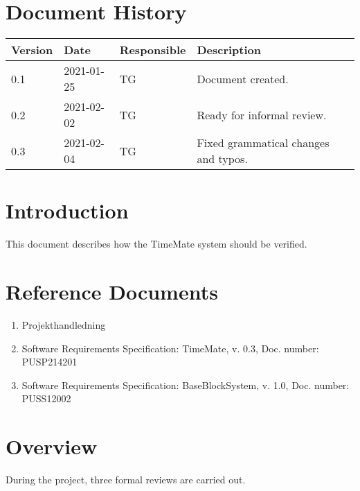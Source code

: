 \documentclass{article}
\date {#1}
\title {
    \documentNumber {02}    
    
    \documentVersion {0.3}
    
    \documentTitle {Software Verification and Validation Specification}
    \documentGroup {2}
    
    \documentResponsible {Test Group}
    \documentAuthors {Test Group}
    
    \documentDate {2021-02-04}
}
\begin{document}
\maketitle
\thispagestyle{empty}

\newpage

\tableofcontents

\newpage



\section{Document History}
\begin{tabular}{ l | l | l | l }
    Version & Date & Responsible & Description \\
    \hline
    0.1 & 2021-01-25 & TG & Document created. \\
    0.2 & 2021-02-02 & TG & Ready for informal review. \\
    0.3 & 2021-02-04 & TG & Fixed grammatical changes and typos. \\
\end{tabular}

\section{Introduction}

	This document describes how the TimeMate system should be verified. 

\section{Reference Documents}

\begin{enumerate}
  \item Projekthandledning 
  \item Software Requirements Specification: TimeMate, v. 0.3, Doc. number: PUSP214201
  \item Software Requirements Specification: BaseBlockSystem, v. 1.0, Doc. number: PUSS12002

\end{enumerate}

\section{Overview}
During the project, three formal reviews are carried out.
\end{document}
